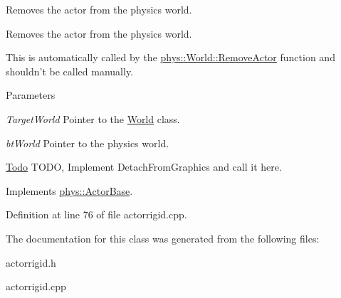 Removes the actor from the physics world. 

Removes the actor from the physics world. \par
 This is automatically called by the \hyperlink{classphys_1_1World_ab00f84983afcc7f6ef1e5a84367d994d}{phys::World::RemoveActor} function and shouldn't be called manually. 
\begin{DoxyParams}{Parameters}
\item[{\em TargetWorld}]Pointer to the \hyperlink{classphys_1_1World}{World} class. \item[{\em btWorld}]Pointer to the physics world. \end{DoxyParams}


\begin{Desc}
\item[\hyperlink{todo__todo000001}{Todo}]TODO, Implement DetachFromGraphics and call it here. \end{Desc}




Implements \hyperlink{classphys_1_1ActorBase_af669724f10d0bf74f4951c85caa42494}{phys::ActorBase}.



Definition at line 76 of file actorrigid.cpp.



The documentation for this class was generated from the following files:\begin{DoxyCompactItemize}
\item 
actorrigid.h\item 
actorrigid.cpp\end{DoxyCompactItemize}

